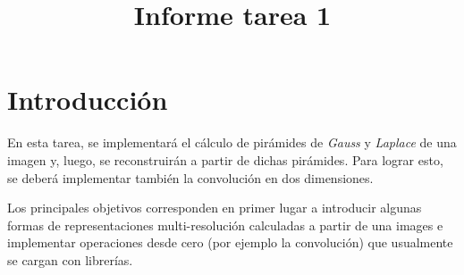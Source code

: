 

\title{Informe tarea 1} %
\newcommand{\ramo}{EL7008-1 Procesamiento Avanzado de Imágenes}
\newcommand{\departamento}{Departamento de Ingeniería Eléctrica}
\newcommand{\semestre}{Semestre Primavera 2020}

\newcommand{\hipertitulo}{}
\newcommand{\titulo}{Tarea 1} 
\newcommand{\subtitulo}{Piramides de \textit{Gauss} y \textit{Laplace}}

\newcommand{\autor}{Diego Irarrázaval I.}










\setcounter{page}{1}
\tableofcontents 
\newpage
\listoffigures
\listoftables
\lstlistoflistings


\newpage
{}
\setcounter{page}{1}

\newpage
\section{Introducción}

\par En esta tarea, se implementará el cálculo de pirámides de \textit{Gauss} y \textit{Laplace} de una imagen y, luego, se reconstruirán a partir de dichas pirámides. Para lograr esto, se deberá implementar también la convolución en dos dimensiones. 
\par Los principales objetivos corresponden en primer lugar a introducir algunas formas de representaciones multi-resolución calculadas a partir de una images e implementar operaciones desde cero (por ejemplo la convolución) que usualmente se cargan con librerías. 

\bigskip

